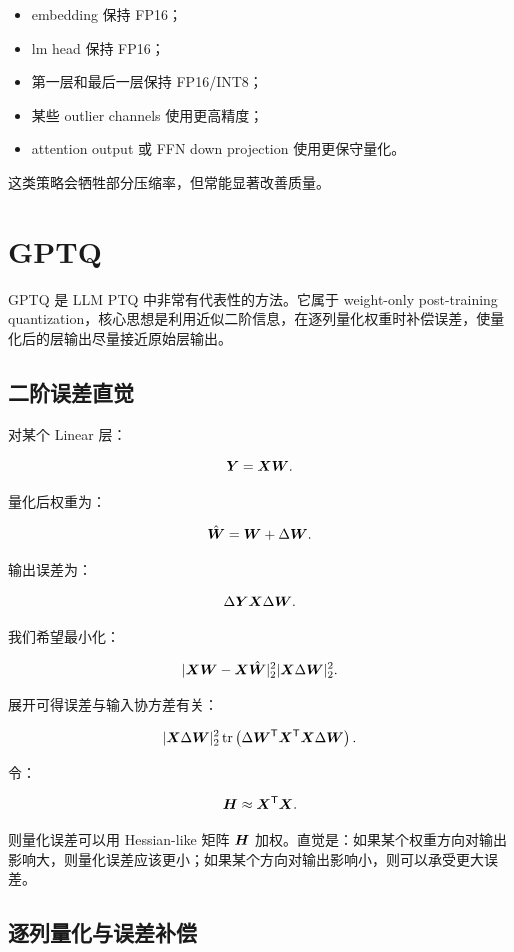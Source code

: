 \begin{itemize}
\item embedding 保持 FP16；
\item lm head 保持 FP16；
\item 第一层和最后一层保持 FP16/INT8；
\item 某些 outlier channels 使用更高精度；
\item attention output 或 FFN down projection 使用更保守量化。
\end{itemize}

这类策略会牺牲部分压缩率，但常能显著改善质量。

\section{GPTQ}
\label{sec:gptq}

GPTQ 是 LLM PTQ 中非常有代表性的方法。它属于 weight-only post-training quantization，核心思想是利用近似二阶信息，在逐列量化权重时补偿误差，使量化后的层输出尽量接近原始层输出。

\subsection{二阶误差直觉}
\label{subsec:gptq-second-order-intuition}

对某个 Linear 层：

\[
\bm{Y}=\bm{X}\bm{W}.
\]

量化后权重为：

\[
\hat{\bm{W}}=\bm{W}+\Delta\bm{W}.
\]

输出误差为：

\[
\Delta\bm{Y}
\bm{X}\Delta\bm{W}.
\]

我们希望最小化：

\[
|\bm{X}\bm{W}-\bm{X}\hat{\bm{W}}|_2^2
|\bm{X}\Delta\bm{W}|_2^2.
\]

展开可得误差与输入协方差有关：

\[
|\bm{X}\Delta\bm{W}|_2^2
\operatorname{tr}
\left(
\Delta\bm{W}^{\mathsf{T}}
\bm{X}^{\mathsf{T}}\bm{X}
\Delta\bm{W}
\right).
\]

令：

\[
\bm{H}\approx \bm{X}^{\mathsf{T}}\bm{X}.
\]

则量化误差可以用 Hessian-like 矩阵 $\bm{H}$ 加权。直觉是：如果某个权重方向对输出影响大，则量化误差应该更小；如果某个方向对输出影响小，则可以承受更大误差。

\subsection{逐列量化与误差补偿}
\label{subsec:gptq-sequential-quantization}

